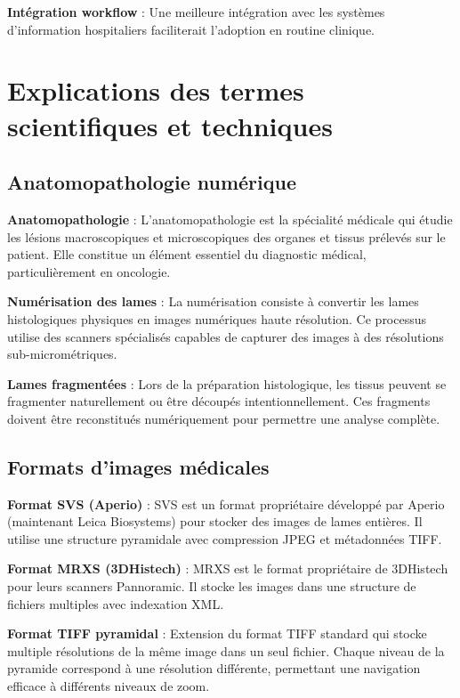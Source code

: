 \documentclass[12pt,a4paper]{report}
\begin{document}
\textbf{Intégration workflow} : Une meilleure intégration avec les systèmes d'information hospitaliers faciliterait l'adoption en routine clinique.

\section{Explications des termes scientifiques et techniques}

\subsection{Anatomopathologie numérique}

\textbf{Anatomopathologie} : L'anatomopathologie est la spécialité médicale qui étudie les lésions macroscopiques et microscopiques des organes et tissus prélevés sur le patient. Elle constitue un élément essentiel du diagnostic médical, particulièrement en oncologie.

\textbf{Numérisation des lames} : La numérisation consiste à convertir les lames histologiques physiques en images numériques haute résolution. Ce processus utilise des scanners spécialisés capables de capturer des images à des résolutions sub-micrométriques.

\textbf{Lames fragmentées} : Lors de la préparation histologique, les tissus peuvent se fragmenter naturellement ou être découpés intentionnellement. Ces fragments doivent être reconstitués numériquement pour permettre une analyse complète.

\subsection{Formats d'images médicales}

\textbf{Format SVS (Aperio)} : SVS est un format propriétaire développé par Aperio (maintenant Leica Biosystems) pour stocker des images de lames entières. Il utilise une structure pyramidale avec compression JPEG et métadonnées TIFF.

\textbf{Format MRXS (3DHistech)} : MRXS est le format propriétaire de 3DHistech pour leurs scanners Pannoramic. Il stocke les images dans une structure de fichiers multiples avec indexation XML.

\textbf{Format TIFF pyramidal} : Extension du format TIFF standard qui stocke multiple résolutions de la même image dans un seul fichier. Chaque niveau de la pyramide correspond à une résolution différente, permettant une navigation efficace à différents niveaux de zoom.
\end{document}
